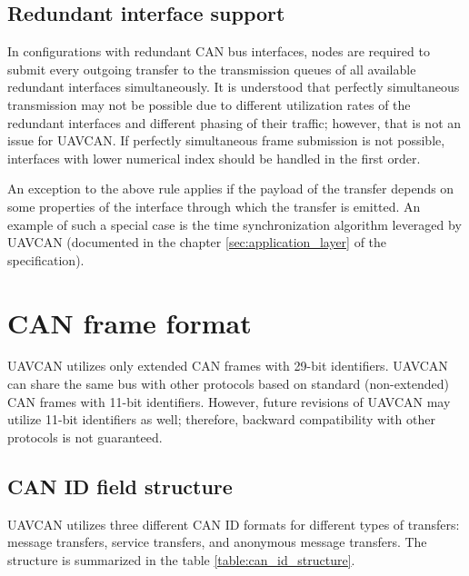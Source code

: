 \subsection{Redundant interface support}

In configurations with redundant CAN bus interfaces,
nodes are required to submit every outgoing transfer to the transmission queues of
all available redundant interfaces simultaneously.
It is understood that perfectly simultaneous transmission may not be possible due to different
utilization rates of the redundant interfaces and different phasing of their traffic;
however, that is not an issue for UAVCAN.
If perfectly simultaneous frame submission is not possible, interfaces with lower numerical index
should be handled in the first order.

An exception to the above rule applies if the payload of the transfer depends on some properties
of the interface through which the transfer is emitted.
An example of such a special case is the time synchronization algorithm leveraged by UAVCAN
(documented in the chapter \ref{sec:application_layer} of the specification).

\section{CAN frame format}

UAVCAN utilizes only extended CAN frames with 29-bit identifiers.
UAVCAN can share the same bus with other protocols based on standard (non-extended) CAN frames with 11-bit identifiers.
However, future revisions of UAVCAN may utilize 11-bit identifiers as well;
therefore, backward compatibility with other protocols is not guaranteed.

\subsection{CAN ID field structure}

UAVCAN utilizes three different CAN ID formats for different types of transfers:
message transfers, service transfers, and anonymous message transfers.
The structure is summarized in the table \ref{table:can_id_structure}.

